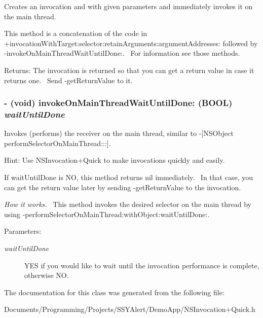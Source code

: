 Creates an invocation and with given parameters and immediately invokes it on the main thread. 

This method is a concatenation of the code in +invocationWithTarget:selector:retainArguments:argumentAddresses: followed by -invokeOnMainThreadWaitUntilDone:.~ For information see those methods.

\begin{Desc}
\item[Returns:]The invocation is returned so that you can get a return value in case it returns one.~ Send -getReturnValue to it. \end{Desc}
\hypertarget{interface_n_s_invocation_07_quick_08_30fb8d77f50edc06f311a1e90e503259}{
\subsubsection[{invokeOnMainThreadWaitUntilDone:}]{\setlength{\rightskip}{0pt plus 5cm}- (void) invokeOnMainThreadWaitUntilDone: (BOOL) {\em waitUntilDone}}}
\label{interface_n_s_invocation_07_quick_08_30fb8d77f50edc06f311a1e90e503259}


Invokes (performs) the receiver on the main thread, similar to -\mbox{[}NSObject performSelectorOnMainThread:::\mbox{]}. 

Hint: Use NSInvocation+Quick to make invocations quickly and easily.

If waitUntilDone is NO, this method returns nil immediately.~ In that case, you can get the return value later by sending -getReturnValue to the invocation.

{\em How it works.\/}~ This method invokes the desired selector on the main thread by using -performSelectorOnMainThread:withObject:waitUntilDone:.

\begin{Desc}
\item[Parameters:]
\begin{description}
\item[{\em waitUntilDone}]YES if you would like to wait until the invocation performance is complete, otherwise NO. \end{description}
\end{Desc}


The documentation for this class was generated from the following file:\begin{CompactItemize}
\item 
Documents/Programming/Projects/SSYAlert/DemoApp/NSInvocation+Quick.h\end{CompactItemize}
